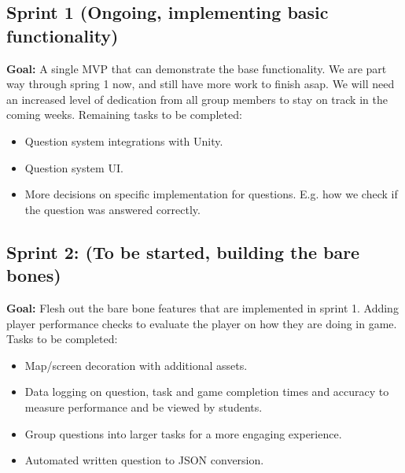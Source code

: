 \documentclass{article}
\begin{document}
\subsection*{Sprint 1 (Ongoing, implementing basic functionality)}
\textbf{Goal:} A single MVP that can demonstrate the base functionality.
\newline
We are part way through spring 1 now, and still have more work to finish asap. We will need an increased level of dedication from all group members to stay on track in the coming weeks.
\newline\newline
Remaining tasks to be completed:
\begin{itemize}
    \item Question system integrations with Unity.
    \item Question system UI.
    \item More decisions on specific implementation for questions. E.g. how we check if the question was answered correctly.
\end{itemize}


\subsection*{Sprint 2: (To be started, building the bare bones)}
\textbf{Goal:} Flesh out the bare bone features that are implemented in sprint 1. Adding player performance checks to evaluate the player on how they are doing in game.
\newline\newline
Tasks to be completed:
\begin{itemize}
    \item Map/screen decoration with additional assets.
    \item Data logging on question, task and game completion times and accuracy to measure performance and be viewed by students.
    \item Group questions into larger tasks for a more engaging experience.
    \item Automated written question to JSON conversion.
\end{itemize}
\end{document}
